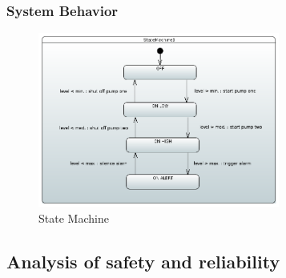 \documentclass[11pt]{article}
\begin{document}
\subsubsection{System Behavior}

\begin{figure}[H]
  \includegraphics[width=300px]{../diagrams/state-machine-wps.png}
  \caption{State Machine}
  \label{fig:State Machine}
\end{figure}

\subsection{Analysis of safety and reliability}
\end{document}
